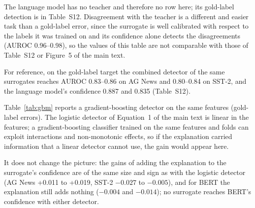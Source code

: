 \documentclass[3p,times,10pt,nopreprintline]{elsarticle}
\begin{document}
The language model has no teacher and therefore no row here; its gold-label detection is in Table~S12. Disagreement with the teacher is a different and easier task than a gold-label error, since the surrogate is well calibrated with respect to the labels it was trained on and its confidence alone detects the disagreements (AUROC 0.96--0.98), so the values of this table are not comparable with those of Table~S12 or Figure~5 of the main text.

For reference, on the gold-label target the combined detector of the same surrogates reaches AUROC 0.83--0.86 on AG News and 0.80--0.84 on SST-2, and the language model's confidence 0.887 and 0.835 (Table~S12).

Table~\ref{tab:gbm} reports a gradient-boosting detector on the same features (gold-label errors). The logistic detector of Equation~1 of the main text is linear in the features; a gradient-boosting classifier trained on the same features and folds can exploit interactions and non-monotonic effects, so if the explanation carried information that a linear detector cannot use, the gain would appear here.

It does not change the picture: the gains of adding the explanation to the surrogate's confidence are of the same size and sign as with the logistic detector (AG News +0.011 to +0.019, SST-2 \(-0.027\) to \(-0.005\)), and for BERT the explanation still adds nothing (\(-0.004\) and \(-0.014\)); no surrogate reaches BERT's confidence with either detector.
\end{document}
